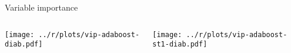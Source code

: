 \begin{frame}{Variable importance}

\begin{columns}[T]
\hspace{-2.5em}\begin{column}{0.515\textwidth}
	\texttt{[image: ../r/plots/vip-adaboost-diab.pdf]}
\end{column}
\hspace{-1.3ex}\begin{column}{0.515\textwidth}
	\texttt{[image: ../r/plots/vip-adaboost-st1-diab.pdf]}
\end{column}
\end{columns}

\end{frame}



%
%



%
%
%

